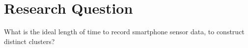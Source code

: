 \documentclass[12pt,a4paper]{article}
\begin{document}




















\section*{Research Question}
What is the ideal length of time to record smartphone sensor data, to construct distinct clusters?
\end{document}
